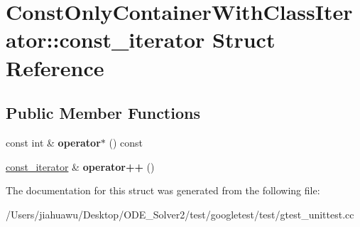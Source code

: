 \hypertarget{struct_const_only_container_with_class_iterator_1_1const__iterator}{}\section{Const\+Only\+Container\+With\+Class\+Iterator\+:\+:const\+\_\+iterator Struct Reference}
\label{struct_const_only_container_with_class_iterator_1_1const__iterator}
\subsection*{Public Member Functions}
\begin{DoxyCompactItemize}
\item 
\mbox{\label{struct_const_only_container_with_class_iterator_1_1const__iterator_ac0e11dc5624359e4d13a9dfcc56586bc}} 
const int \& {\bfseries operator$\ast$} () const
\item 
\mbox{\label{struct_const_only_container_with_class_iterator_1_1const__iterator_a99150bd6377f80d9944b95aa2a5c7805}} 
\mbox{\hyperlink{struct_const_only_container_with_class_iterator_1_1const__iterator}{const\+\_\+iterator}} \& {\bfseries operator++} ()
\end{DoxyCompactItemize}


The documentation for this struct was generated from the following file\+:\begin{DoxyCompactItemize}
\item 
/\+Users/jiahuawu/\+Desktop/\+O\+D\+E\+\_\+\+Solver2/test/googletest/test/gtest\+\_\+unittest.\+cc\end{DoxyCompactItemize}
